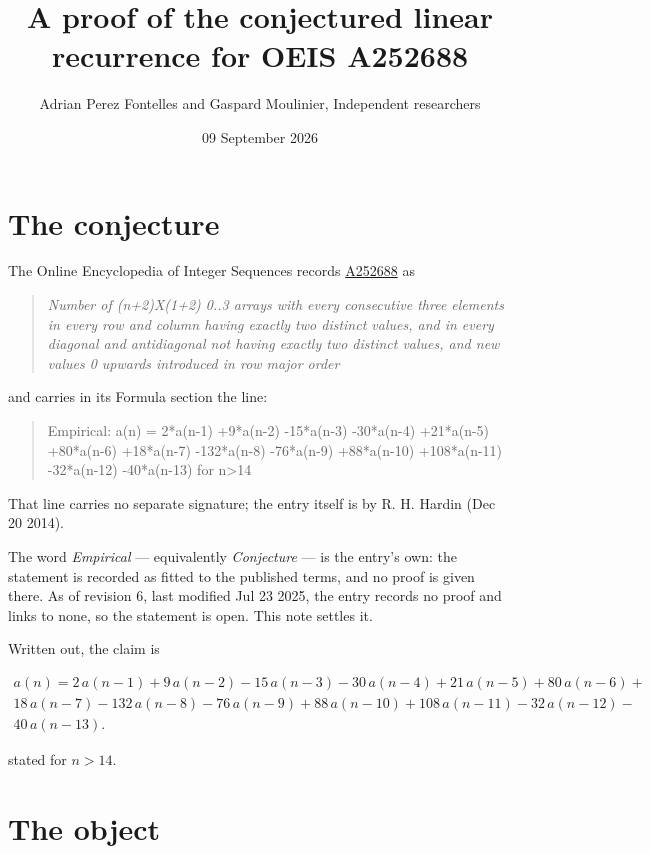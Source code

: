 \documentclass[11pt]{article}
\title{A proof of the conjectured linear recurrence for OEIS A252688}
\author{Adrian Perez Fontelles and Gaspard Moulinier, Independent researchers}
\date{09 September 2026}
\theoremstyle{definition}
\begin{document}
\maketitle
\section{The conjecture}

The Online Encyclopedia of Integer Sequences records \href{https://oeis.org/A252688}{A252688} as

\begin{quote}\itshape Number of (n+2)X(1+2) 0..3 arrays with every consecutive three elements in every row and column having exactly two distinct values, and in every diagonal and antidiagonal not having exactly two distinct values, and new values 0 upwards introduced in row major order\end{quote}

and carries in its Formula section the line:

\begin{quote}\ttfamily Empirical: a(n) = 2*a(n-1) +9*a(n-2) -15*a(n-3) -30*a(n-4) +21*a(n-5) +80*a(n-6) +18*a(n-7) -132*a(n-8) -76*a(n-9) +88*a(n-10) +108*a(n-11) -32*a(n-12) -40*a(n-13) for n>14\end{quote}

That line carries no separate signature; the entry itself is by R. H. Hardin (Dec 20 2014).

The word {\itshape Empirical} --- equivalently {\itshape Conjecture} --- is the entry's own: the statement is recorded as fitted to the published terms, and no proof is given there. As of revision 6, last modified Jul 23 2025, the entry records no proof and links to none, so the statement is open. This note settles it.

Written out, the claim is

\begin{multline*} a(n) = 2\,a(n-1) + 9\,a(n-2) - 15\,a(n-3) - 30\,a(n-4) + 21\,a(n-5) + 80\,a(n-6) + \\ 18\,a(n-7) - 132\,a(n-8) - 76\,a(n-9) + 88\,a(n-10) + 108\,a(n-11) - 32\,a(n-12) - \\ 40\,a(n-13). \end{multline*}

stated for $n > 14$.

\section{The object}
\end{document}
